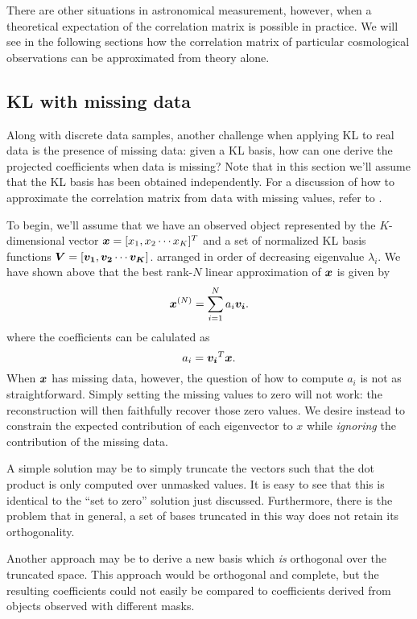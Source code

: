 There are other situations in astronomical measurement, however, when a
theoretical expectation of the correlation matrix is possible in practice.
We will see in the following sections how the correlation matrix of
particular cosmological observations can be approximated from theory alone.


\subsection{KL with missing data}
Along with discrete data samples, another challenge when applying KL to
real data is the presence of missing data: given a KL basis, how can
one derive the projected coefficients when data is missing?
Note that in this section we'll assume that the KL basis has been
obtained independently.  For a discussion of how to approximate the
correlation matrix from data with missing values, refer to \citet{Yip04a}.

To begin, we'll assume that we have
an observed object represented by the $K$-dimensional vector 
$\boldsymbol{x} = [x_1, x_2 \cdots x_K]^T$ and a set of normalized
KL basis functions 
$\boldsymbol{V} = [\boldsymbol{v_1}, \boldsymbol{v_2} \cdots \boldsymbol{v_K}]$.
arranged in order of decreasing eigenvalue $\lambda_i$.  We have shown above
that the best rank-$N$ linear approximation of $\boldsymbol{x}$ is given by
\begin{equation}
  \boldsymbol{x}^{(N)} = \sum_{i=1}^{N}a_i\boldsymbol{v_i}.
\end{equation}
where the coefficients can be calulated as
\begin{equation}
  \label{eq:a_coeff_def}
  a_i = \boldsymbol{v_i}^T\boldsymbol{x}.
\end{equation}
When $\boldsymbol{x}$ has missing data,
however, the question of how to compute $a_i$ is not as straightforward.
Simply setting the missing values to zero
will not work: the reconstruction will then faithfully recover those
zero values.  We desire instead to constrain the expected contribution
of each eigenvector to $x$ while {\it ignoring} the contribution of the
missing data.

A simple solution may be to simply truncate the vectors such that the dot
product is only computed over unmasked values.  It is easy to see that this
is identical to the  ``set to zero'' solution just
discussed.  Furthermore, there is the problem that in general, a set
of bases truncated in this way does not retain its orthogonality.

Another approach may be to derive a new basis which {\it is} orthogonal
over the truncated space.  This approach would be orthogonal and complete,
but the resulting coefficients could not easily be compared to coefficients
derived from objects observed with different masks.

